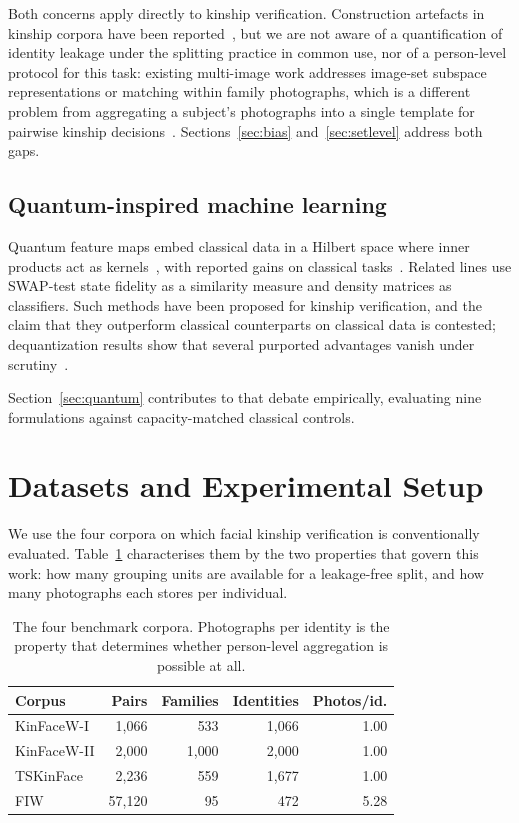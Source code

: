 \documentclass[journal,12pt]{IEEEtran}
\begin{document}
Both concerns apply directly to kinship verification. Construction artefacts in
kinship corpora have been reported~\cite{dawson2018samephoto}, but we are not aware
of a quantification of identity leakage under the splitting practice in common
use, nor of a person-level protocol for this task: existing multi-image work
addresses image-set subspace representations or matching within family
photographs, which is a different problem from aggregating a subject's
photographs into a single template for pairwise kinship
decisions~\cite{kohli2019imageset}. Sections~\ref{sec:bias}
and~\ref{sec:setlevel} address both gaps.

\subsection{Quantum-inspired machine learning}

Quantum feature maps embed classical data in a Hilbert space where inner
products act as kernels~\cite{schuld2019quantum}, with reported gains on
classical tasks~\cite{havlicek2019supervised}. Related lines use SWAP-test
state fidelity as a similarity measure and density matrices as classifiers.
Such methods have been proposed for kinship verification, and the claim that
they outperform classical counterparts on classical data is contested;
dequantization results show that several purported advantages
vanish under scrutiny~\cite{tang2019quantum}.

Section~\ref{sec:quantum} contributes to that debate empirically, evaluating
nine formulations against capacity-matched classical controls.

\section{Datasets and Experimental Setup}
\label{sec:data}

We use the four corpora on which facial kinship verification is conventionally
evaluated. Table~\ref{tab:datasets} characterises them by the two properties
that govern this work: how many grouping units are available for a
leakage-free split, and how many photographs each stores per individual.

\begin{table}[t]
\caption{The four benchmark corpora. Photographs per identity is the property
that determines whether person-level aggregation is possible at all.}
\label{tab:datasets}
\centering
\small
\begin{tabular}{lrrrr}
\toprule
Corpus & Pairs & Families & Identities & Photos/id. \\
\midrule
KinFaceW-I & 1{,}066 & 533 & 1{,}066 & 1.00 \\
KinFaceW-II & 2{,}000 & 1{,}000 & 2{,}000 & 1.00 \\
TSKinFace & 2{,}236 & 559 & 1{,}677 & 1.00 \\
FIW & 57{,}120 & 95 & 472 & 5.28 \\
\bottomrule
\end{tabular}
\end{table}
\end{document}
